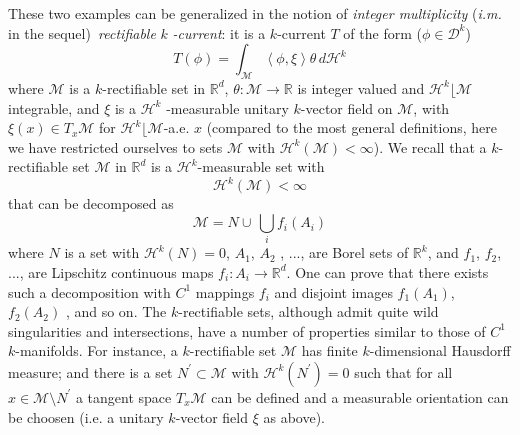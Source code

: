 \documentclass{article}
\begin{document}
These two examples can be generalized in the notion of \textit{integer
multiplicity }(\textit{i.m.} in the sequel)\textit{\ rectifiable }$k$\textit{%
-current}: it is a $k$-current $T$ of the form ($\phi \in \mathcal{D}^{k}$) 
\begin{equation*}
T\left( \phi \right) =\int_{\mathcal{M}}\left\langle \phi ,\xi \right\rangle
\theta \,d\mathcal{H}^{k}
\end{equation*}
where $\mathcal{M}$ is a $k$-rectifiable set in $\mathbb{R}^{d}$, $\theta :%
\mathcal{M}\rightarrow \mathbb{R}$ is integer valued and $\mathcal{H}%
^{k}\lfloor \mathcal{M}$ integrable, and $\xi $ is a $\mathcal{H}^{k}$%
-measurable unitary $k$-vector field on $\mathcal{M}$, with $\xi \left(
x\right) \in T_{x}\mathcal{M}$ for $\mathcal{H}^{k}\lfloor \mathcal{M}$-a.e. 
$x$ (compared to the most general definitions, here we have restricted
ourselves to sets $\mathcal{M}$ with $\mathcal{H}^{k}\left( \mathcal{M}%
\right) <\infty $). We recall that a $k$-rectifiable set $\mathcal{M}$ in $%
\mathbb{R}^{d}$ is a $\mathcal{H}^{k}$-measurable set with 
\begin{equation*}
\mathcal{H}^{k}\left( \mathcal{M}\right) <\infty
\end{equation*}
that can be decomposed as 
\begin{equation*}
\mathcal{M}=N\cup \,\bigcup_{i}f_{i}\left( A_{i}\right)
\end{equation*}
where $N$ is a set with $\mathcal{H}^{k}\left( N\right) =0$, $A_{1}$, $A_{2}$%
, ..., are Borel sets of $\mathbb{R}^{k}$, and $f_{1}$, $f_{2}$, ..., are
Lipschitz continuous maps $f_{i}:A_{i}\rightarrow \mathbb{R}^{d}$. One can
prove that there exists such a decomposition with $C^{1}$ mappings $f_{i}$
and disjoint images $f_{1}\left( A_{1}\right) $, $f_{2}\left( A_{2}\right) $%
, and so on. The $k$-rectifiable sets, although admit quite wild
singularities and intersections, have a number of properties similar to
those of $C^{1}$ $k$-manifolds. For instance, a $k$-rectifiable set $%
\mathcal{M}$ has finite $k$-dimensional Hausdorff measure; and there is a
set $N^{\prime }\subset \mathcal{M}$ with $\mathcal{H}^{k}\left( N^{\prime
}\right) =0$ such that for all $x\in \mathcal{M}\setminus N^{\prime }$ a
tangent space $T_{x}\mathcal{M}$ can be defined and a measurable orientation
can be choosen (i.e. a unitary $k$-vector field $\xi $ as above).
\end{document}
